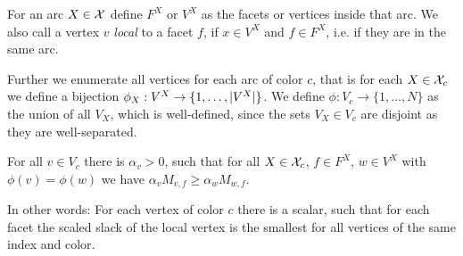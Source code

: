 For an arc $X \in \mathcal{X}$ define $F^X$ or $V^X$ as the facets or vertices inside that arc. We also call a vertex $v$ \emph{local} to a facet $f$, if $x \in V^X$ and $f \in F^X$, i.e. if they are in the same arc.

Further we enumerate all vertices for each arc of color $c$, that is for each $X \in \mathcal{X}_c$ we define a bijection $\phi_X: V^X \to \{1,\dots,\lvert V^X\rvert\}$. We define $\phi: V_c \to \{1,\dots,N\}$ as the union of all $V_X$, which is well-defined, since the sets $V_X \in V_c$ are disjoint as they are well-separated.

\begin{lemma}\label{lemma:alphas}
  For all $v \in V_c$ there is $\alpha_v > 0$, such that for all $X \in \mathcal{X}_c$, $f \in F^X$, $w \in V^X$ with $\phi(v)=\phi(w)$ we have $\alpha_v M_{v,f} \geq \alpha_w M_{w,f}$.
\end{lemma}

In other words: For each vertex of color $c$ there is a scalar, such that for each facet the scaled slack of the local vertex is the smallest for all vertices of the same index and color.

